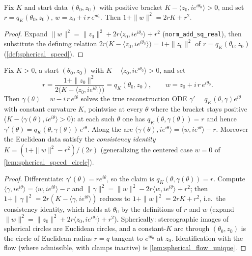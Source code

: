\begin{lemma}
  \label{lem:constant_arc_consistency}
  Fix $K$ and start data $(\theta_0,z_0)$ with positive bracket
  $K-\langle z_0,ie^{i\theta_0}\rangle>0$, and set $r=q_K(\theta_0,z_0)$,
  $w=z_0+i\,r\,e^{i\theta_0}$. Then $1+\|w\|^2=2rK+r^2$.
\end{lemma}

\begin{proof}

\leanok
  Expand $\|w\|^2=\|z_0\|^2+2r\langle z_0,ie^{i\theta_0}\rangle+r^2$
  (\texttt{norm\_add\_sq\_real}), then substitute the defining relation
  $2r\bigl(K-\langle z_0,ie^{i\theta_0}\rangle\bigr)=1+\|z_0\|^2$ of
  $r=q_K(\theta_0,z_0)$ (\cref{def:spherical_speed}).
\end{proof}

\begin{lemma}

  \label{lem:constant_curvature_arc}
  Fix $K>0$, a start $(\theta_0,z_0)$ with $K-\langle z_0,ie^{i\theta_0}\rangle>0$, and set
  \[
    r=\frac{1+\|z_0\|^2}{2\bigl(K-\langle z_0,ie^{i\theta_0}\rangle\bigr)}=q_K(\theta_0,z_0),
    \qquad w=z_0+i\,r\,e^{i\theta_0}.
  \]
  Then $\gamma(\theta)=w-i\,r\,e^{i\theta}$ solves the true reconstruction ODE
  $\gamma'=q_K(\theta,\gamma)e^{i\theta}$ with constant curvature $K$, pointwise at every $\theta$
  where the bracket stays positive ($K-\langle \gamma(\theta),ie^{i\theta}\rangle>0$): at each
  such $\theta$ one has $q_K(\theta,\gamma(\theta))=r$ and hence
  $\gamma'(\theta)=q_K(\theta,\gamma(\theta))\,e^{i\theta}$. Along the arc
  $\langle \gamma(\theta),ie^{i\theta}\rangle=\langle w,ie^{i\theta}\rangle-r$. Moreover the
  Euclidean data satisfy the \emph{consistency identity} $K=(1+\|w\|^2-r^2)/(2r)$
  (generalizing the centered case $w=0$ of \cref{lem:spherical_speed_circle}).
\end{lemma}

\begin{proof}

\leanok
  Differentiate: $\gamma'(\theta)=r e^{i\theta}$, so the claim is $q_K(\theta,\gamma(\theta))=r$.
  Compute $\langle \gamma,ie^{i\theta}\rangle=\langle w,ie^{i\theta}\rangle-r$ and
  $\|\gamma\|^2=\|w\|^2-2r\langle w,ie^{i\theta}\rangle+r^2$; then
  $1+\|\gamma\|^2=2r(K-\langle \gamma,ie^{i\theta}\rangle)$ reduces to
  $1+\|w\|^2=2rK+r^2$, i.e.\ the consistency identity, which holds at $\theta_0$ by the
  definitions of $r$ and $w$ (expand $\|w\|^2=\|z_0\|^2+2r\langle z_0,ie^{i\theta_0}
  \rangle+r^2$). Spherically: stereographic images of spherical circles are Euclidean
  circles, and a constant-$K$ arc through $(\theta_0,z_0)$ is the circle of Euclidean
  radius $r=q$ tangent to $e^{i\theta_0}$ at $z_0$. Identification with the flow (where
  admissible, with clamps inactive) is \cref{lem:spherical_flow_unique}.
\end{proof}

